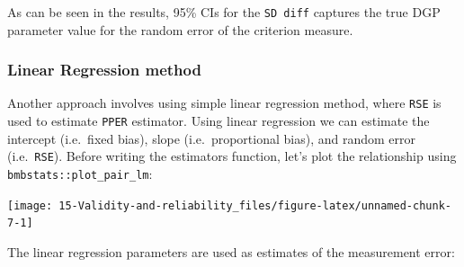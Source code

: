 \documentclass[
]{book}
\newenvironment{Shaded}{\begin{snugshade}}{\end{snugshade}}
\newcommand{\DataTypeTok}[1]{\textcolor[rgb]{0.13,0.29,0.53}{#1}}
\newcommand{\FloatTok}[1]{\textcolor[rgb]{0.00,0.00,0.81}{#1}}
\newcommand{\KeywordTok}[1]{\textcolor[rgb]{0.13,0.29,0.53}{\textbf{#1}}}
\newcommand{\NormalTok}[1]{#1}
\newcommand{\OperatorTok}[1]{\textcolor[rgb]{0.81,0.36,0.00}{\textbf{#1}}}
\newcommand{\StringTok}[1]{\textcolor[rgb]{0.31,0.60,0.02}{#1}}
\begin{document}
As can be seen in the results, 95\% CIs for the \texttt{SD\ diff} captures the true DGP parameter value for the random error of the criterion measure.

\hypertarget{linear-regression-method}{%
\subsubsection{Linear Regression method}\label{linear-regression-method}}

Another approach involves using simple linear regression method, where \texttt{RSE} is used to estimate \texttt{PPER} estimator. Using linear regression we can estimate the intercept (i.e.~fixed bias), slope (i.e.~proportional bias), and random error (i.e.~\texttt{RSE}). Before writing the estimators function, let's plot the relationship using \texttt{bmbstats::plot\_pair\_lm}:

\begin{Shaded}
\end{Shaded}

\begin{center}\texttt{[image: 15-Validity-and-reliability\_files/figure-latex/unnamed-chunk-7-1]} \end{center}

The linear regression parameters are used as estimates of the measurement error:
\end{document}
